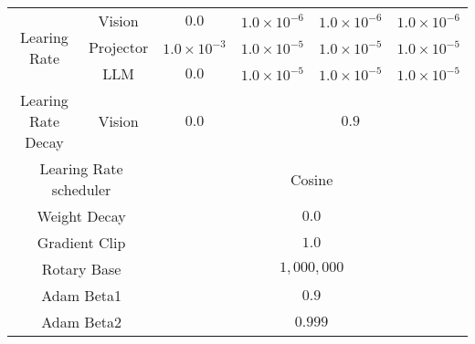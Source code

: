 \begin{table*}[!htbp]
\begin{center}
\begin{adjustbox}{max width=0.99\textwidth}
\begin{tabular}{c|c|c|c|c|c}
\multirow{3}{*}{Learing Rate} & Vision & $0.0$ & $1.0 \times 10^{-6}$ & $1.0 \times 10^{-6}$ & $1.0 \times 10^{-6}$ \\
\cmidrule{2-6}
& Projector & $1.0 \times 10^{-3}$ & $1.0 \times 10^{-5}$ & $1.0 \times 10^{-5}$ & $1.0 \times 10^{-5}$ \\
\cmidrule{2-6}
& LLM & $0.0$ & $1.0 \times 10^{-5}$ & $1.0 \times 10^{-5}$ & $1.0 \times 10^{-5}$ \\
\midrule
\multirow{1}{*}{Learing Rate Decay} & Vision & $0.0$ & \multicolumn{3}{c}{$0.9$} \\
\midrule
\multicolumn{2}{c|}{\multirow{1}{*}{Learing Rate scheduler}} & \multicolumn{4}{c}{Cosine} \\
\midrule
\multicolumn{2}{c|}{Weight Decay} & \multicolumn{4}{c}{$0.0$} \\
\midrule
\multicolumn{2}{c|}{Gradient Clip} & \multicolumn{4}{c}{$1.0$} \\
\midrule
\multicolumn{2}{c|}{Rotary Base} & \multicolumn{4}{c}{$1,000,000$} \\
\midrule
\multicolumn{2}{c|}{Adam Beta1} & \multicolumn{4}{c}{$0.9$} \\
\midrule
\multicolumn{2}{c|}{Adam Beta2} & \multicolumn{4}{c}{$0.999$} \\



 \bottomrule%
 \end{tabular}
 \end{adjustbox}
 \end{center}
 \label{table_train}
\end{table*}